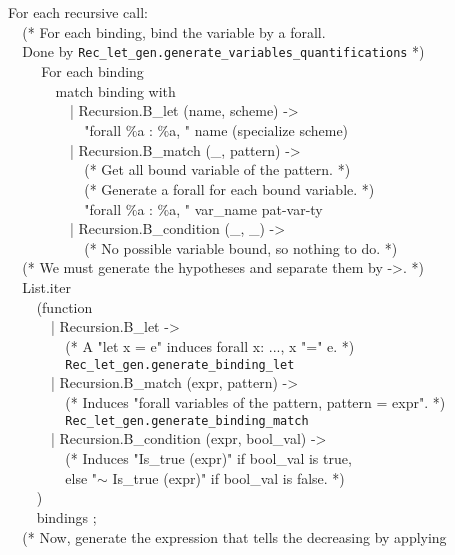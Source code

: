 \noindent For each recursive call:\\
\verb+  +(* For each binding, bind the variable by a forall. \\
\verb+  +Done by {\tt Rec\_let\_gen.generate\_variables\_quantifications} *) \\
\verb+    + For each binding \\
\verb+      + match binding with \\
\verb+        + | Recursion.B\_let (name, scheme) -> \\
\verb+          + "forall $\%$a : $\%$a, " name (specialize scheme) \\
\verb+        + | Recursion.B\_match (\_, pattern) -> \\
\verb+          + (* Get all bound variable of the pattern. *) \\
\verb+          + (* Generate a forall for each bound variable. *) \\
\verb+          + "forall $\%$a : $\%$a, " var\_name pat-var-ty \\
\verb+        + | Recursion.B\_condition (\_, \_) -> \\
\verb+          +  (* No possible variable bound, so nothing to do. *) \\
\verb+  +(* We must generate the hypotheses and separate them by ->. *) \\
\verb+  +List.iter \\
\verb+    +(function \\
\verb+      +| Recursion.B\_let ->\\
\verb+        +(* A "let x = e" induces forall x: ..., x "=" e. *) \\
\verb+        +{\tt Rec\_let\_gen.generate\_binding\_let} \\
\verb+      +| Recursion.B\_match (expr, pattern) ->\\
\verb+        +(* Induces "forall variables of the pattern, pattern = expr". *) \\
\verb+        +{\tt Rec\_let\_gen.generate\_binding\_match} \\
\verb+      +| Recursion.B\_condition (expr, bool\_val) ->\\
\verb+        +(* Induces "Is\_true (expr)" if bool\_val is true,\\
\verb+        +else "$\sim$ Is\_true (expr)" if bool\_val is false. *) \\
\verb+    +) \\
\verb+    +bindings ;\\
\verb+  +(* Now, generate the expression that tells the decreasing by applying \\
